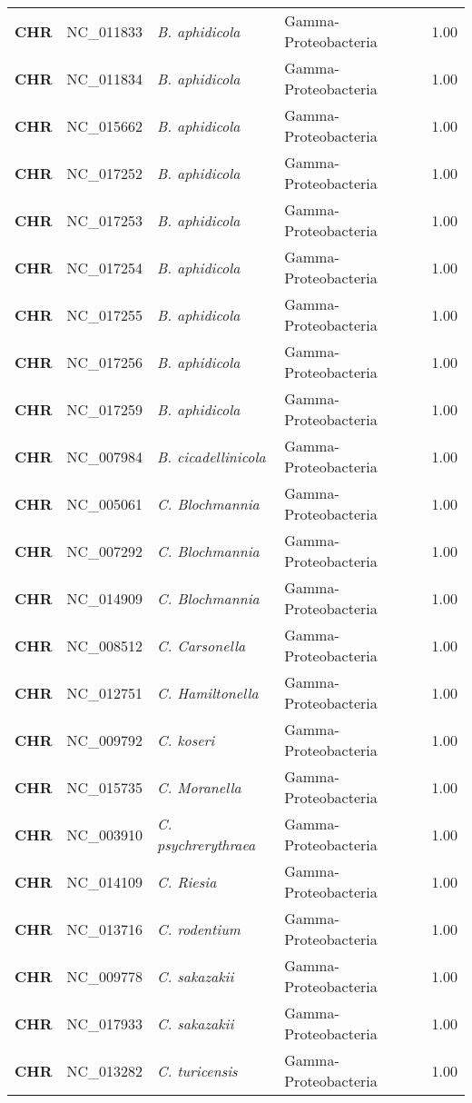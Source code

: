 \begin{adjustwidth}{-3cm}{2cm}
{\begin{supertabular}{>{\bfseries}l|p{0.1\textwidth}p{0.14\textwidth}l|l}
CHR & NC\_011833 & \textit{B. aphidicola} & Gamma-Proteobacteria & 1.00\\
CHR & NC\_011834 & \textit{B. aphidicola} & Gamma-Proteobacteria & 1.00\\
CHR & NC\_015662 & \textit{B. aphidicola} & Gamma-Proteobacteria & 1.00\\
CHR & NC\_017252 & \textit{B. aphidicola} & Gamma-Proteobacteria & 1.00\\
CHR & NC\_017253 & \textit{B. aphidicola} & Gamma-Proteobacteria & 1.00\\
CHR & NC\_017254 & \textit{B. aphidicola} & Gamma-Proteobacteria & 1.00\\
CHR & NC\_017255 & \textit{B. aphidicola} & Gamma-Proteobacteria & 1.00\\
CHR & NC\_017256 & \textit{B. aphidicola} & Gamma-Proteobacteria & 1.00\\
CHR & NC\_017259 & \textit{B. aphidicola} & Gamma-Proteobacteria & 1.00\\
CHR & NC\_007984 & \textit{B. cicadellinicola} & Gamma-Proteobacteria & 1.00\\
CHR & NC\_005061 & \textit{C. Blochmannia} & Gamma-Proteobacteria & 1.00\\
CHR & NC\_007292 & \textit{C. Blochmannia} & Gamma-Proteobacteria & 1.00\\
CHR & NC\_014909 & \textit{C. Blochmannia} & Gamma-Proteobacteria & 1.00\\
CHR & NC\_008512 & \textit{C. Carsonella} & Gamma-Proteobacteria & 1.00\\
CHR & NC\_012751 & \textit{C. Hamiltonella} & Gamma-Proteobacteria & 1.00\\
CHR & NC\_009792 & \textit{C. koseri} & Gamma-Proteobacteria & 1.00\\
CHR & NC\_015735 & \textit{C. Moranella} & Gamma-Proteobacteria & 1.00\\
CHR & NC\_003910 & \textit{C. psychrerythraea} & Gamma-Proteobacteria & 1.00\\
CHR & NC\_014109 & \textit{C. Riesia} & Gamma-Proteobacteria & 1.00\\
CHR & NC\_013716 & \textit{C. rodentium} & Gamma-Proteobacteria & 1.00\\
CHR & NC\_009778 & \textit{C. sakazakii} & Gamma-Proteobacteria & 1.00\\
CHR & NC\_017933 & \textit{C. sakazakii} & Gamma-Proteobacteria & 1.00\\
CHR & NC\_013282 & \textit{C. turicensis} & Gamma-Proteobacteria & 1.00\\

\end{supertabular}}
\end{adjustwidth}
